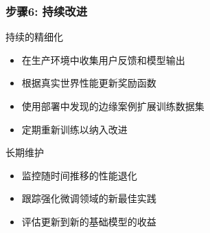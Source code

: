\documentclass[aspectratio=169]{beamer}
\begin{document}
\begin{frame}
	\frametitle{步骤6: 持续改进}
	\begin{block}{持续的精细化}
		\begin{itemize}
			\item 在生产环境中收集用户反馈和模型输出
			\item 根据真实世界性能更新奖励函数
			\item 使用部署中发现的边缘案例扩展训练数据集
			\item 定期重新训练以纳入改进
		\end{itemize}
	\end{block}
	\begin{block}{长期维护}
		\begin{itemize}
			\item 监控随时间推移的性能退化
			\item 跟踪强化微调领域的新最佳实践 
			\item 评估更新到新的基础模型的收益
		\end{itemize}
	\end{block}
\end{frame}
\end{document}
